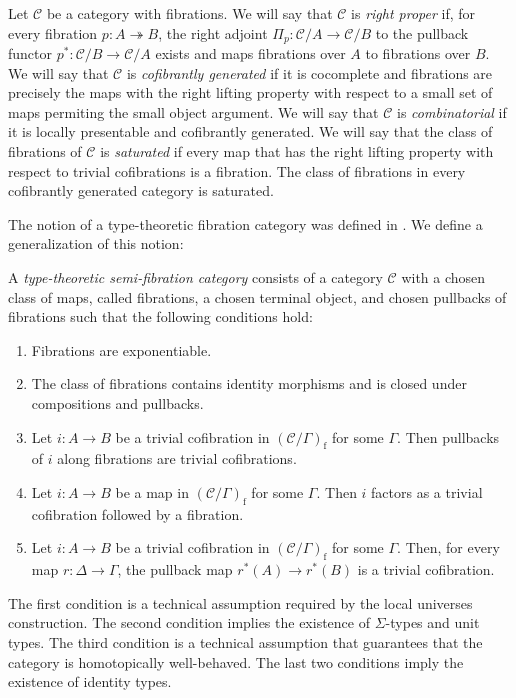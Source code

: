 \documentclass[reqno]{amsart}
\theoremstyle{definition}
\theoremstyle{remark}
\newcommand{\fs}[1]{\mathrm{#1}}
\newcommand{\scat}[1]{\mathcal{#1}}
\numberwithin{figure}{section}
\begin{document}
Let $\scat{C}$ be a category with fibrations.
We will say that $\scat{C}$ is \emph{right proper} if, for every fibration $p : A \twoheadrightarrow B$, the right adjoint $\Pi_p : \scat{C}/A \to \scat{C}/B$ to the pullback functor $p^* : \scat{C}/B \to \scat{C}/A$ exists and maps fibrations over $A$ to fibrations over $B$.
We will say that $\scat{C}$ is \emph{cofibrantly generated} if it is cocomplete and fibrations are precisely the maps with the right lifting property with respect to a small set of maps permiting the small object argument.
We will say that $\scat{C}$ is \emph{combinatorial} if it is locally presentable and cofibrantly generated.
We will say that the class of fibrations of $\scat{C}$ is \emph{saturated} if every map that has the right lifting property with respect to trivial cofibrations is a fibration.
The class of fibrations in every cofibrantly generated category is saturated.

The notion of a type-theoretic fibration category was defined in \cite[Definition~2.1]{shul-inv}.
We define a generalization of this notion:
\begin{defn}[ttsfc]
A \emph{type-theoretic semi-fibration category} consists of a category $\scat{C}$ with a chosen class of maps, called fibrations, a chosen terminal object, and chosen pullbacks of fibrations such that the following conditions hold:
\begin{enumerate}
\item \label{it:ttsfc-pi} Fibrations are exponentiable.
\item \label{it:ttsfc-fib} The class of fibrations contains identity morphisms and is closed under compositions and pullbacks.
\item Let $i : A \to B$ be a trivial cofibration in $(\scat{C}/\Gamma)_\fs{f}$ for some $\Gamma$.
Then pullbacks of $i$ along fibrations are trivial cofibrations.
\item \label{it:ttsfc-factor} Let $i : A \to B$ be a map in $(\scat{C}/\Gamma)_\fs{f}$ for some $\Gamma$.
Then $i$ factors as a trivial cofibration followed by a fibration.
\item Let $i : A \to B$ be a trivial cofibration in $(\scat{C}/\Gamma)_\fs{f}$ for some $\Gamma$.
Then, for every map $r : \Delta \to \Gamma$, the pullback map $r^*(A) \to r^*(B)$ is a trivial cofibration.
\end{enumerate}
\end{defn}

The first condition is a technical assumption required by the local universes construction.
The second condition implies the existence of $\Sigma$-types and unit types.
The third condition is a technical assumption that guarantees that the category is homotopically well-behaved.
The last two conditions imply the existence of identity types.
\end{document}

